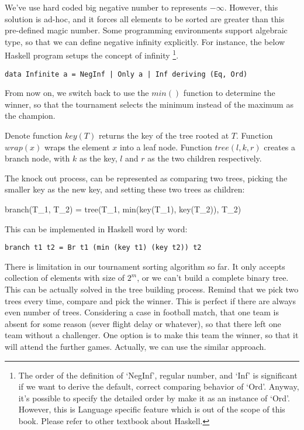\documentclass[UTF8]{article}
\begin{document}
We've use hard coded big negative number to represents $-\infty$. However, this solution is ad-hoc, and
it forces all elements to be sorted are greater than this pre-defined magic number. Some programming
environments support algebraic type, so that we can define negative infinity explicitly. For instance,
the below Haskell program setups the concept of infinity \footnote{The order of the definition of `NegInf',
regular number, and `Inf' is significant if we want to derive the default, correct comparing behavior of `Ord'.
Anyway, it's possible to specify the detailed order by make it as an instance of `Ord'. However, this is
Language specific feature which is out of the scope of this book. Please refer to other textbook about Haskell.}.

\lstset{language=Haskell}
\begin{lstlisting}
data Infinite a = NegInf | Only a | Inf deriving (Eq, Ord)
\end{lstlisting}

From now on, we switch back to use the $min()$ function to determine the winner, so that the tournament selects the minimum
instead of the maximum as the champion.

Denote function $key(T)$ returns the key of the tree rooted at $T$. Function $wrap(x)$ wraps the element
$x$ into a leaf node. Function $tree(l, k, r)$ creates a branch node, with $k$ as the key, $l$ and $r$
as the two children respectively.

The knock out process, can be represented as comparing two trees, picking the smaller key as the new
key, and setting these two trees as children:

\be
branch(T_1, T_2) = tree(T_1, min(key(T_1), key(T_2)), T_2)
\ee

This can be implemented in Haskell word by word:

\lstset{language=Haskell}
\begin{lstlisting}
branch t1 t2 = Br t1 (min (key t1) (key t2)) t2
\end{lstlisting}

There is limitation in our tournament sorting algorithm so far. It only accepts collection of elements
with size of $2^m$, or we can't build a complete binary tree. This can be actually solved in the tree
building process. Remind that we pick two trees every time, compare and pick the winner. This is perfect
if there are always even number of trees. Considering a case in football match, that one team is absent
for some reason (sever flight delay or whatever), so that there left one team without a challenger.
One option is to make this team the winner, so that it will attend the further games. Actually, we can
use the similar approach.
\end{document}
